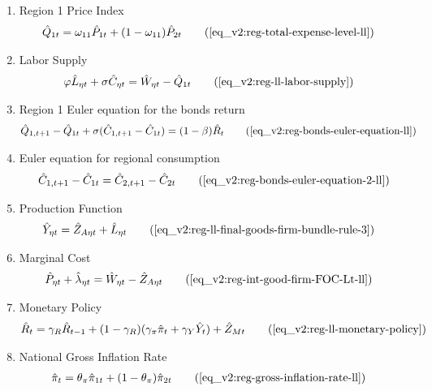 \documentclass[../thesis.tex]{subfiles}
\begin{document}
{\begin{itemize}
\begin{enumerate}
		\item Region 1 Price Index
		\begin{align}
			\hat{Q}_{1t} &= \omega_{11} \hat{P}_{1 t} + (1 -\omega_{11}) \hat{P}_{2 t} \tag{\ref{eq_v2:reg-total-expense-level-ll}}
		\end{align}
		
		\item Labor Supply
		\begin{alignat}{2}
			\varphi \hat{L}_{\eta t} + \sigma \hat{C}_{\eta t} &= \hat{W}_{\eta t} - \hat{Q}_{1t} \tag{\ref{eq_v2:reg-ll-labor-supply}}
		\end{alignat}
		
		\item Region 1 Euler equation for the bonds return
		\begin{align}
			\hat{Q}_{1, t+1} - \hat{Q}_{1t} + \sigma (\hat{C}_{1, t+1} - \hat{C}_{1t}) &= (1 - \beta) \hat{R}_{t} \tag{\ref{eq_v2:reg-bonds-euler-equation-ll}}
		\end{align}
		
		\item Euler equation for regional consumption
		\begin{align}
			\hat{C}_{1, t+1} - \hat{C}_{1t} = \hat{C}_{2, t+1} - \hat{C}_{2t} \tag{\ref{eq_v2:reg-bonds-euler-equation-2-ll}}
		\end{align}
		
		\item Production Function
		\begin{align}
			\hat{Y}_{\eta t} &= \hat{Z}_{A\eta t} + \hat{L}_{\eta t} \tag{\ref{eq_v2:reg-ll-final-goods-firm-bundle-rule-3}}
		\end{align}
		
		\item Marginal Cost
		\begin{align}
			\hat{P}_{\eta t} + \hat{\lambda}_{\eta t} &= \hat{W}_{\eta t} - \hat{Z}_{A\eta t} \tag{\ref{eq_v2:reg-int-good-firm-FOC-Lt-ll}}
		\end{align}
		
		\item Monetary Policy
		\begin{align}
			\hat{R}_t = \gamma_{R} \hat{R}_{t-1} + (1-\gamma_{R})(\gamma_{\pi} \hat{\pi}_t + \gamma_{Y} \hat{Y}_t) + \hat{Z}_{Mt} \tag{\ref{eq_v2:reg-ll-monetary-policy}}
		\end{align}
		
		\item National Gross Inflation Rate
		\begin{align}
			\hat{\pi}_{t} &= \theta_{\pi} \hat{\pi}_{1t} + (1 - \theta_{\pi}) \hat{\pi}_{2t} \tag{\ref{eq_v2:reg-gross-inflation-rate-ll}}
		\end{align}
		

\end{enumerate}
\end{itemize}}
\end{document}

